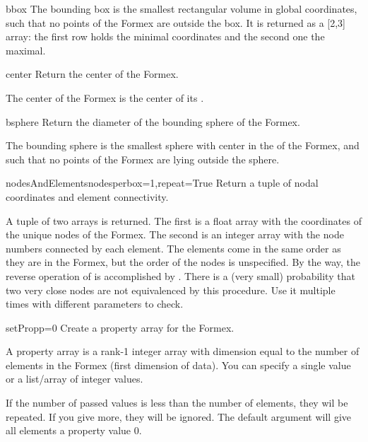 {{\begin{methoddesc}  {bbox}{}
The bounding box is the smallest rectangular volume in global coordinates, such that no points of the Formex are outside the box. It is returned as a [2,3] array: the first row holds the minimal coordinates and the second one the maximal.
\end{methoddesc}

\begin{methoddesc}  {center}{}
Return the center of the Formex.

The center of the Formex is the center of its .
\end{methoddesc}

\begin{methoddesc}  {bsphere}{}
Return the diameter of the bounding sphere of the Formex.

The bounding sphere is the smallest sphere with center in the  of the Formex, and such that no points of the Formex are lying outside the sphere.
\end{methoddesc}

\begin{methoddesc}  {nodesAndElements}{nodesperbox=1,repeat=True}
Return a tuple of nodal coordinates and element connectivity.

A tuple of two arrays is returned. The first is a float array with the coordinates of the unique nodes of the Formex. The second is an integer array with the node numbers connected by each element. The elements come in the same order as they are in the Formex, but the order of the nodes is unspecified. By the way, the reverse operation of
 is accomplished by . There is a (very small) probability that two very close nodes are not equivalenced by this procedure. Use it multiple times with different parameters to check.
\end{methoddesc}

\begin{methoddesc}  {setProp}{p=0}
Create a property array for the Formex.

A property array is a rank-1 integer array with dimension equal to the number of elements in the Formex (first dimension of data). You can specify a single value or a list/array of integer values.

If the number of passed values is less than the number of elements, they wil be repeated. If you give more, they will be ignored. The default argument will give all elements a property value 0.
\end{methoddesc}

}}
